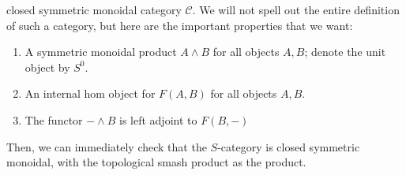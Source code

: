 \documentclass{article}
\theoremstyle{definition}
\theoremstyle{definition}
\theoremstyle{definition}
\theoremstyle{definition}
\theoremstyle{definition}
\theoremstyle{definition}
\theoremstyle{definition}
\begin{document}
closed symmetric monoidal category $\mathcal{C}$. We will not spell out the entire definition of such a category, but here are the important properties that we want:
\begin{enumerate}
    \item A symmetric monoidal product $A\wedge B$ for all objects $A,B$; denote the unit object by $S^0$.
    \item An internal hom object for $F(A,B)$ for all objects $A,B$.
    \item The functor $-\wedge B$ is left adjoint to $F(B,-)$
\end{enumerate}
Then, we can immediately check that the $S$-category is closed symmetric monoidal, with the topological smash product as the product. 
\end{document}
